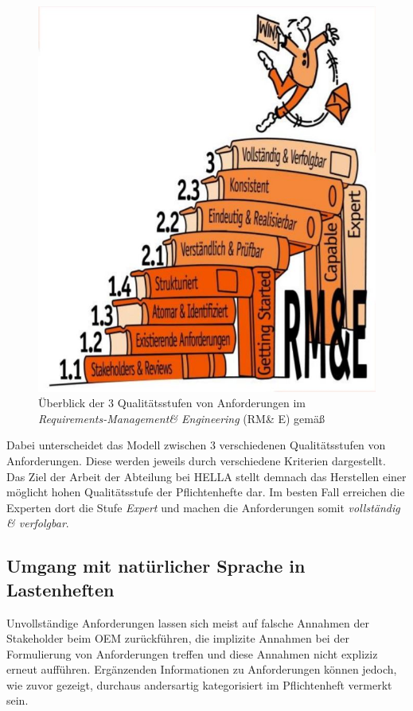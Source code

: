 \documentclass[12pt]{report}
\begin{document}
\begin{figure}[h!]
\begin{center}
\includegraphics[scale=0.5]{Bilder/HOOD-RE.jpg}
\caption{Überblick der 3 Qualitätsstufen von Anforderungen im \textit{Requirements-Management\& Engineering} (RM\& E) gemäß \cite{hp12}}
\end{center}
\end{figure}

Dabei unterscheidet das Modell zwischen 3 verschiedenen Qualitätsstufen von Anforderungen. Diese werden jeweils durch verschiedene Kriterien dargestellt. Das Ziel der Arbeit der Abteilung bei HELLA stellt demnach das Herstellen einer möglicht hohen Qualitätsstufe der Pflichtenhefte dar. Im besten Fall erreichen die Experten dort die Stufe \textit{Expert} und machen die Anforderungen somit \textit{vollständig \& verfolgbar}.

\subsection{Umgang mit natürlicher Sprache in Lastenheften}
Unvollständige Anforderungen lassen sich meist auf falsche Annahmen der Stakeholder beim OEM zurückführen, die implizite Annahmen bei der Formulierung von Anforderungen treffen und diese Annahmen nicht expliziz erneut aufführen. Ergänzenden Informationen zu Anforderungen können jedoch, wie zuvor gezeigt, durchaus andersartig kategorisiert im Pflichtenheft vermerkt sein. 
\end{document}
